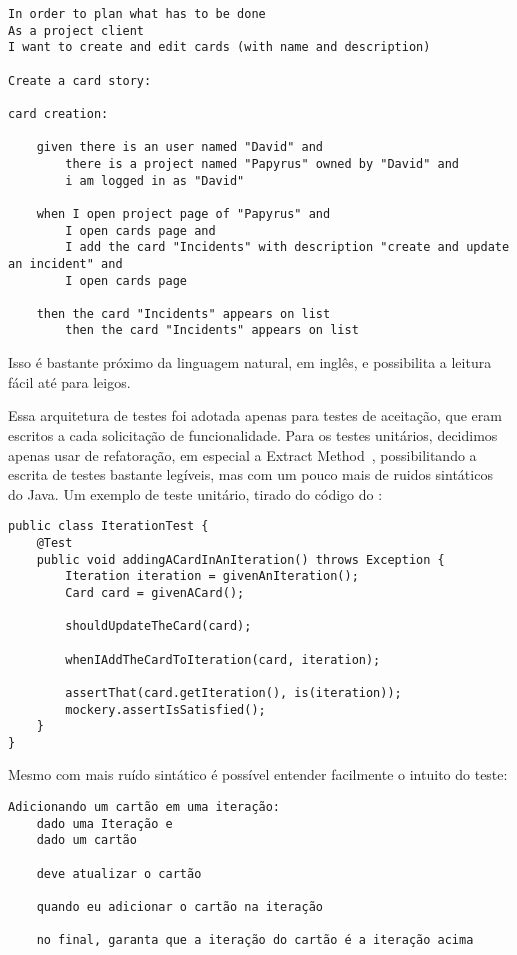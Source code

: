 \begin{verbatim}
In order to plan what has to be done
As a project client
I want to create and edit cards (with name and description)

Create a card story:

card creation:
	
	given there is an user named "David" and
		there is a project named "Papyrus" owned by "David" and
		i am logged in as "David"

	when I open project page of "Papyrus" and
		I open cards page and
		I add the card "Incidents" with description "create and update an incident" and
		I open cards page
			
	then the card "Incidents" appears on list
		then the card "Incidents" appears on list
\end{verbatim}

Isso é bastante próximo da linguagem natural, em inglês, e possibilita a leitura fácil até para leigos.

Essa arquitetura de testes foi adotada apenas para testes de aceitação, que eram escritos a cada solicitação de
funcionalidade. Para os testes unitários, decidimos apenas usar de refatoração, em especial a 
Extract Method~\cite{refactoring}, possibilitando a escrita de testes bastante
legíveis, mas com um pouco mais de ruidos sintáticos do Java. Um exemplo de teste unitário, tirado do código do \calopsita:

\begin{lstlisting}
public class IterationTest {
	@Test
	public void addingACardInAnIteration() throws Exception {
		Iteration iteration = givenAnIteration();
		Card card = givenACard();

		shouldUpdateTheCard(card);

		whenIAddTheCardToIteration(card, iteration);

		assertThat(card.getIteration(), is(iteration));
		mockery.assertIsSatisfied();
	}
}
\end{lstlisting}

Mesmo com mais ruído sintático é possível entender facilmente o intuito do teste:

\begin{verbatim}
Adicionando um cartão em uma iteração:
	dado uma Iteração e
	dado um cartão
  
	deve atualizar o cartão
  
	quando eu adicionar o cartão na iteração
  
	no final, garanta que a iteração do cartão é a iteração acima
\end{verbatim}

